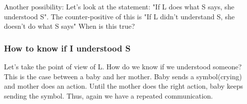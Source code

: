 \documentclass{article}
\begin{document}
Another possibility:
Let's look at the statement: "If L does what S says, she understood S". The counter-positive of this is "If L didn't understand S, she doesn't do what S says" When is this true?

\subsubsection{How to know if I understood S}
Let's take the point of view of L. How do we know if we understood someone? This is the case between a baby and her mother. Baby sends a symbol(crying) and mother does an action. Until the mother does the right action, baby keeps sending the symbol. Thus, again we have a repeated communication. 
\end{document}
